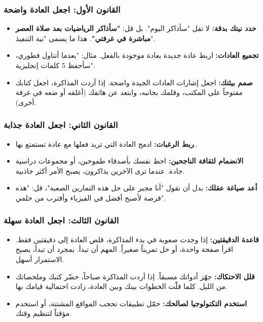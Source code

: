 \documentclass[12pt,a4paper]{book}
\begin{document}
	\subsubsection{القانون الأول: اجعل العادة واضحة }
	\begin{itemize}
		\item \textbf{حدد نيتك بدقة:} لا تقل "سأذاكر اليوم". بل قل: \textbf{"سأذاكر الرياضيات بعد صلاة العصر مباشرة في غرفتي"}. هذا ما يسمى "نية التنفيذ".
		\item \textbf{تجميع العادات:} اربط عادة جديدة بعادة موجودة بالفعل. مثال: "بعدما أتناول فطوري، سأحفظ 5 كلمات إنجليزية".
		\item \textbf{صمم بيئتك:} اجعل إشارات العادات الجيدة واضحة. إذا أردت المذاكرة، اجعل كتابك مفتوحاً على المكتب، وقلمك بجانبه، وابتعد عن هاتفك (أغلقه أو ضعه في غرفة أخرى).
	\end{itemize}
	
	\subsubsection{القانون الثاني: اجعل العادة جذابة }
	\begin{itemize}
		\item \textbf{ربط الرغبات:} ادمج العادة التي تريد فعلها مع عادة تستمتع بها..
		\item \textbf{الانضمام لثقافة الناجحين:} احط نفسك بأصدقاء طموحين، أو مجموعات دراسية جادة. عندما ترى الآخرين يذاكرون، يصبح الأمر أكثر جاذبية.
		\item \textbf{أعد صياغة عقلك:} بدل أن تقول "أنا مجبر على حل هذه التمارين الصعبة"، قل: "هذه فرصة لأصبح أفضل في الفيزياء وأقترب من حلمي".
	\end{itemize}
	
	\subsubsection{القانون الثالث: اجعل العادة سهلة }
	\begin{itemize}
		\item \textbf{قاعدة الدقيقتين:} إذا وجدت صعوبة في بدء المذاكرة، قلص العادة إلى دقيقتين فقط. اقرأ صفحة واحدة، أو حل تمريناً صغيراً. المهم أن تبدأ. بمجرد أن تبدأ، يصبح الاستمرار أسهل.
		\item \textbf{قلل الاحتكاك:} جهّز أدواتك مسبقاً. إذا أردت المذاكرة صباحاً، حضّر كتبك وملخصاتك من الليل. كلما قلّت الخطوات بينك وبين العادة، زادت احتمالية قيامك بها.
		\item \textbf{استخدم التكنولوجيا لصالحك:} حمّل تطبيقات تحجب المواقع المشتتة، أو استخدم مؤقتاً لتنظيم وقتك.
	\end{itemize}
	
\end{document}
